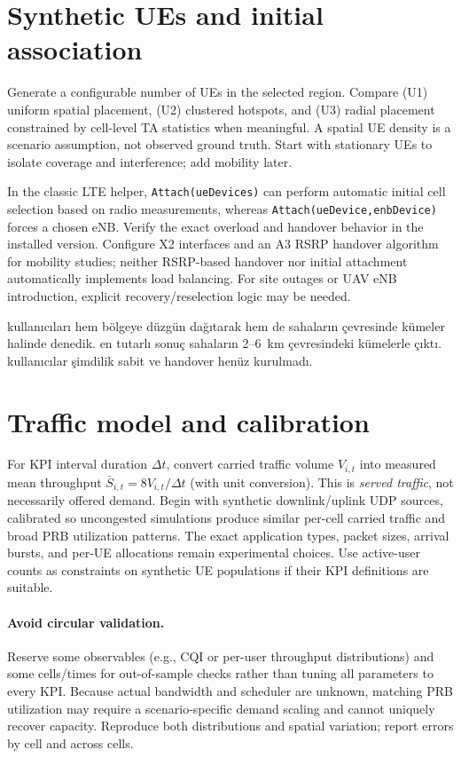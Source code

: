 \documentclass[11pt,a4paper]{article}
\newenvironment{progress}{\par\smallskip\color{blue}}{\par\smallskip}
\begin{document}
\section{Synthetic UEs and initial association}
Generate a configurable number of UEs in the selected region. Compare (U1) uniform spatial placement, (U2) clustered hotspots, and (U3) radial placement constrained by cell-level TA statistics when meaningful. A spatial UE density is a scenario assumption, not observed ground truth. Start with stationary UEs to isolate coverage and interference; add mobility later.

In the classic LTE helper, \texttt{Attach(ueDevices)} can perform automatic initial cell selection based on radio measurements, whereas \texttt{Attach(ueDevice,enbDevice)} forces a chosen eNB. Verify the exact overload and handover behavior in the installed version. Configure X2 interfaces and an A3 RSRP handover algorithm for mobility studies; neither RSRP-based handover nor initial attachment automatically implements load balancing. For site outages or UAV eNB introduction, explicit recovery/reselection logic may be needed.

\begin{progress}
kullanıcıları hem bölgeye düzgün dağıtarak hem de sahaların çevresinde kümeler halinde denedik. en tutarlı sonuç sahaların 2--6~km çevresindeki kümelerle çıktı. kullanıcılar şimdilik sabit ve handover henüz kurulmadı.
\end{progress}

\section{Traffic model and calibration}
\label{sec:traffic}
For KPI interval duration $\Delta t$, convert carried traffic volume $V_{i,t}$ into measured mean throughput $\bar S_{i,t}=8V_{i,t}/\Delta t$ (with unit conversion). This is \emph{served traffic}, not necessarily offered demand. Begin with synthetic downlink/uplink UDP sources, calibrated so uncongested simulations produce similar per-cell carried traffic and broad PRB utilization patterns. The exact application types, packet sizes, arrival bursts, and per-UE allocations remain experimental choices. Use active-user counts as constraints on synthetic UE populations if their KPI definitions are suitable.

\paragraph{Avoid circular validation.} Reserve some observables (e.g., CQI or per-user throughput distributions) and some cells/times for out-of-sample checks rather than tuning all parameters to every KPI. Because actual bandwidth and scheduler are unknown, matching PRB utilization may require a scenario-specific demand scaling and cannot uniquely recover capacity. Reproduce both distributions and spatial variation; report errors by cell and across cells.
\end{document}
